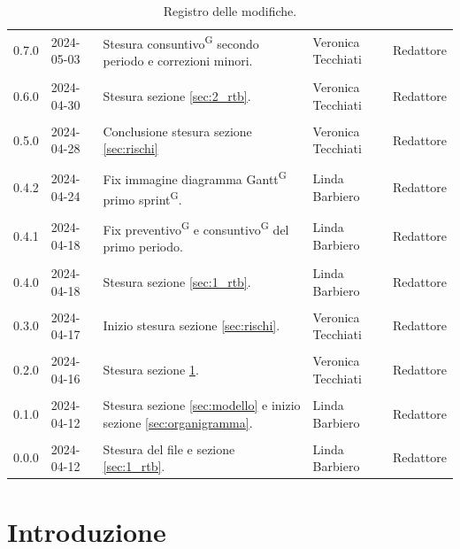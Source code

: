 \documentclass[8pt]{article}
\newcommand{\glossterm}[1]{#1\textsuperscript{G}} %
\begin{document}
\begin{table}[ht!]
\begin{tabular}{p{1.2cm} p{2cm} p{6cm} p{3cm} p{2cm}}
        0.7.0 & 2024-05-03 & Stesura \glossterm{consuntivo} secondo periodo e correzioni minori. & Veronica Tecchiati & Redattore \\\\
        0.6.0 & 2024-04-30 & Stesura sezione \ref{sec:2_rtb}. & Veronica Tecchiati & Redattore \\\\
        0.5.0 & 2024-04-28 & Conclusione stesura sezione \ref{sec:rischi} & Veronica Tecchiati & Redattore \\\\
		0.4.2 & 2024-04-24 & Fix immagine diagramma \glossterm{Gantt} primo \glossterm{sprint}. & Linda Barbiero & Redattore \\\\
		0.4.1 & 2024-04-18 & Fix \glossterm{preventivo} e \glossterm{consuntivo} del primo periodo. & Linda Barbiero & Redattore \\\\
		0.4.0 & 2024-04-18 & Stesura sezione \ref{sec:1_rtb}. & Linda Barbiero & Redattore \\\\
		0.3.0 & 2024-04-17 & Inizio stesura sezione \ref{sec:rischi}. & Veronica Tecchiati & Redattore \\\\
		0.2.0 & 2024-04-16 & Stesura sezione \ref{sec:intro}. & Veronica Tecchiati & Redattore \\\\
		0.1.0 & 2024-04-12 & Stesura sezione \ref{sec:modello} e inizio sezione \ref{sec:organigramma}. & Linda Barbiero & Redattore \\\\
		0.0.0 & 2024-04-12 & Stesura del file e sezione \ref{sec:1_rtb}. & Linda Barbiero & Redattore \\
		\bottomrule
	\end{tabular}
	\caption{Registro delle modifiche.}
	\label{table:Registro delle modifiche}
\end{table}
\newpage
{\hypersetup{hidelinks} \tableofcontents}
\clearpage
\newpage
\newpage
{\hypersetup{hidelinks} \listoffigures}
\newpage
{\hypersetup{hidelinks} \listoftables}
\newpage
\justifying
\section{Introduzione} \label{sec:intro}
\end{document}
